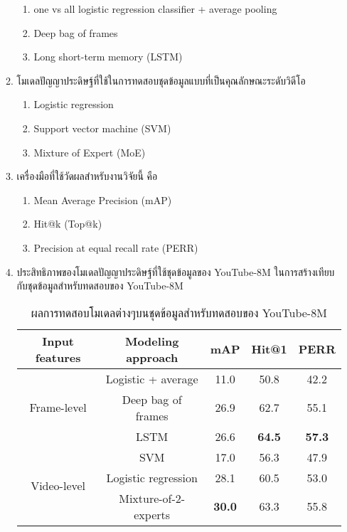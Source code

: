 \begin{enumerate}
\begin{enumerate}
\begin{enumerate}
				\setlength\itemsep{-0.25em}
				\item one vs all logistic regression classifier + average pooling
				\item Deep bag of frames
				\item Long short-term memory (LSTM)
			\end{enumerate}
		\item โมเดลปัญญาประดิษฐ์ที่ใช้ในการทดสอบชุดข้อมูลแบบที่เป็นคุณลักษณะระดับวิดีโอ
			\begin{enumerate}
				\setlength\itemsep{-0.25em}
				\item Logistic regression
				\item Support vector machine (SVM)
				\item Mixture of Expert (MoE)
			\end{enumerate}
		\item เครื่องมือที่ใช้วัดผลสำหรับงานวิจัยนี้ คือ
			\begin{enumerate}
				\setlength\itemsep{-0.25em}
				\item Mean Average Precision (mAP)
				\item Hit@k (Top@k)
				\item Precision at equal recall rate (PERR)
			\end{enumerate}
		\item ประสิทธิภาพของโมเดลปัญญาประดิษฐ์ที่ใช้ชุดข้อมูลของ YouTube-8M ในการสร้างเทียบกับชุดข้อมูลสำหรับทดสอบของ YouTube-8M
			\begin{table}[!ht]
				\centering
				\begin{tabular}{|c|c|c|c|c|}
					\hline
					{Input features} & {Modeling approach} & {mAP} & Hit@1 & PERR\\
					\hline
					\multirow{3}{*}{Frame-level} & Logistic + average & 11.0 & 50.8 & 42.2\\
					& Deep bag of frames & 26.9 & 62.7 & 55.1\\
					& LSTM & 26.6 & \textbf{64.5} & \textbf{57.3}\\
					\hline
					\multirow{3}{*}{Video-level} & SVM & 17.0 & 56.3 & 47.9\\
					& Logistic regression & 28.1 & 60.5 & 53.0\\
					& Mixture-of-2-experts & \textbf{30.0} & 63.3 & 55.8\\
					\hline
				\end{tabular}
				\caption{ผลการทดสอบโมเดลต่างๆบนชุดข้อมูลสำหรับทดสอบของ YouTube-8M}
				\label{tab: youtube_youtube}
			\end{table}

\end{enumerate}
\end{enumerate}
